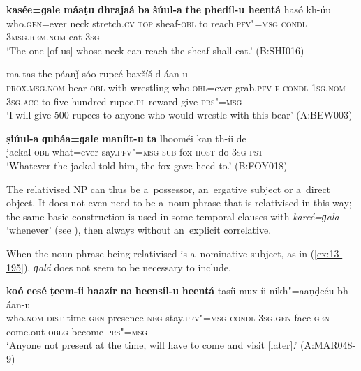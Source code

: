 \begin{exe}
\ex
\label{ex:13-192}
\gll \textbf{kasée=ɡale} \textbf{máaṭu} \textbf{dhraǰaá} \textbf{ba} \textbf{šúul-a} \textbf{the} \textbf{ phedíl-u heentá} hasó kh-úu \\
who.\textsc{gen}=ever neck stretch.\textsc{cv} \textsc{top} sheaf-\textsc{obl} to  reach.\textsc{pfv"=msg} \textsc{condl} \textsc{3msg.rem.nom} eat-\textsc{3sg} \\
\glt `The one [of us] whose neck can reach the sheaf shall eat.' (B:SHI016)

\ex
\label{ex:13-193}
\gll [anú íṇc̣-a sanɡí mháala kií=ɡala ɡhašíl-i  heentá] ma tas
the páanǰ sóo rupeé baxšíš  d-áan-u\\
\textsc{prox.msg.nom}{\protect\footnotemark} bear-\textsc{obl} with wrestling who.\textsc{obl}=ever grab.\textsc{pfv-f} \textsc{condl} \textsc{1sg.nom} \textsc{3sg.acc} to five hundred rupee.\textsc{pl} reward give-\textsc{prs"=msg}\\
\glt `I will give 500 rupees to anyone who would wrestle with this bear' (A:BEW003)

\ex
\label{ex:13-194}
\gll \textbf{ṣiúul-a} \textbf{ɡubáa=ɡale} \textbf{maníit-u} \textbf{ta} lhooméi kaṇ  th-íi de \\
jackal-\textsc{obl} what=ever say.\textsc{pfv"=msg} \textsc{sub} fox \textsc{host} do-\textsc{3sg} \textsc{pst} \\
\glt `Whatever the jackal told him, the fox gave heed to.' (B:FOY018) 
\end{exe}



The relativised NP can thus be a~possessor, an~ergative subject or a~direct object. It does not even need to be a~noun phrase that is relativised in this way; the same basic construction is used in some temporal clauses with \textit{kareé=ɡala} `whenever' (see ), then always without an~explicit correlative.


When the noun phrase being relativised is a~nominative subject, as in (\ref{ex:13-195}), \textit{ɡalá} does not seem to be necessary to include. 

\begin{exe}
\ex
\label{ex:13-195}
\gll \textbf{koó} \textbf{eesé} \textbf{ṭeem-íi} \textbf{haazír} \textbf{na} \textbf{heensíl-u} \textbf{ heentá} tasíi mux-íi nikh"=aaṇḍeéu bh-áan-u \\
who.\textsc{nom} \textsc{dist} time-\textsc{gen} presence \textsc{neg} stay.\textsc{pfv"=msg}  \textsc{condl } \textsc{3sg.gen} face-\textsc{gen} come.out-\textsc{oblg} become-\textsc{prs"=msg} \\
\glt `Anyone not present at the time, will have to come and visit [later].' (A:MAR048-9)
\end{exe}

